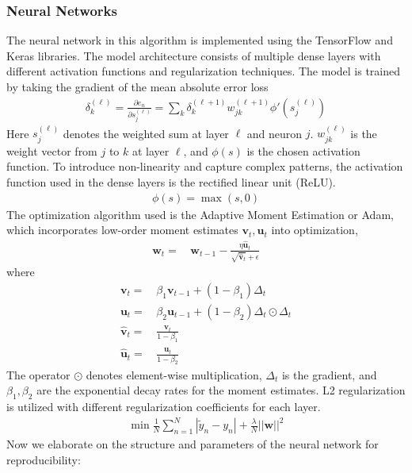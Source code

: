 \documentclass{article}
\begin{document}
\subsubsection{Neural Networks}
The neural network in this algorithm is implemented using the TensorFlow and Keras libraries. The model architecture consists of multiple dense layers with different activation functions and regularization techniques. The model is trained by taking the gradient of the mean absolute error loss
\begin{align}
\delta_k^{(\ell)}=\frac{\partial e_n}{\partial s_{j}^{(\ell)}}=\sum_k\delta_k^{(\ell+1)}w_{jk}^{(\ell+1)}\phi'(s_j^{(\ell)})
\end{align}
Here $s_{j}^{(\ell)}$ denotes the weighted sum at layer $\ell$ and neuron $j$. $w_{jk}^{(\ell)}$ is the weight vector from $j$ to $k$ at layer $\ell$, and $\phi(s)$ is the chosen activation function. To introduce non-linearity and capture complex patterns, the activation function used in the dense layers is the rectified linear unit (ReLU). 
\begin{align}
\phi(s)=\max(s, 0)
\end{align}
The optimization algorithm used is the Adaptive Moment Estimation or Adam\cite{adam}, which incorporates low-order moment estimates $\mathbf{v}_t, \mathbf{u}_t$ into optimization,
\begin{align}
    \mathbf{w}_t=&\,\mathbf{w}_{t-1}-\frac{\eta\hat{\mathbf{u}}_t}{\sqrt{\hat{\mathbf{v}}_t}+\epsilon}
\end{align}
where
\begin{align}
    \mathbf{v}_t =&\, \beta_1\mathbf{v}_{t-1}+(1-\beta_1)\Delta_t\\
    \mathbf{u}_t =&\,\beta_2 \mathbf{u}_{t-1}+(1-\beta_2)\Delta_t\odot\Delta_t\\
    \hat{\mathbf{v}}_t =&\,\frac{\mathbf{v}_t}{1-\beta_1}\\
    \hat{\mathbf{u}}_t =&\,\frac{\mathbf{u}_t}{1-\beta_2}
\end{align}
The operator $\odot$ denotes element-wise multiplication, $\Delta_t$ is the gradient, and $\beta_1, \beta_2$ are the exponential decay rates for the moment estimates. L2 regularization is utilized with different regularization coefficients for each layer. 
\begin{align}
\min\frac{1}{N}\sum_{n=1}^N|\tilde{y}_n-y_n|+\frac{\lambda}{N}||\mathbf{w}||^2
\end{align}
Now we elaborate on the structure and parameters of the neural network for reproducibility:
\end{document}
